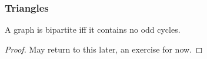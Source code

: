 \documentclass{article}
\begin{document}
\subsubsection{Triangles}










\begin{nthm}\label{thm:7}
    A graph is bipartite iff it contains no odd cycles.
\end{nthm}
\begin{proof}
    May return to this later, an exercise for now.
\end{proof}
\end{document}
